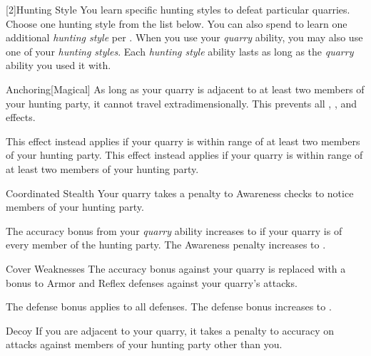         [2]{Hunting Style}
        You learn specific hunting styles to defeat particular quarries.
        Choose one hunting style from the list below.
        You can also spend  to learn one additional \textit{hunting style} per .
        When you use your \textit{quarry} ability, you may also use one of your \textit{hunting styles}.
        Each \textit{hunting style} ability lasts as long as the \textit{quarry} ability you used it with.
        {
            \begin{freeability}{Anchoring}[Magical]
                As long as your quarry is adjacent to at least two members of your hunting party, it cannot travel extradimensionally.
                This prevents all , , and  effects.

                \rankline
                 This effect instead applies if your quarry is within \rngmed range of at least two members of your hunting party.
                 This effect instead applies if your quarry is within \rnglong range of at least two members of your hunting party.
            \end{freeability}

            \begin{freeability}{Coordinated Stealth}
                Your quarry takes a  penalty to Awareness checks to notice members of your hunting party.

                \rankline
                 The accuracy bonus from your \textit{quarry} ability increases to  if your quarry is \unaware of every member of the hunting party.
                 The Awareness penalty increases to .
            \end{freeability}

            \begin{freeability}{Cover Weaknesses}
                The accuracy bonus against your quarry is replaced with a  bonus to Armor and Reflex defenses against your quarry's attacks.

                \rankline
                 The defense bonus applies to all defenses.
                 The defense bonus increases to .
            \end{freeability}

            \begin{freeability}{Decoy}
                If you are adjacent to your quarry, it takes a  penalty to accuracy on attacks against members of your hunting party other than you.


\end{freeability}}
